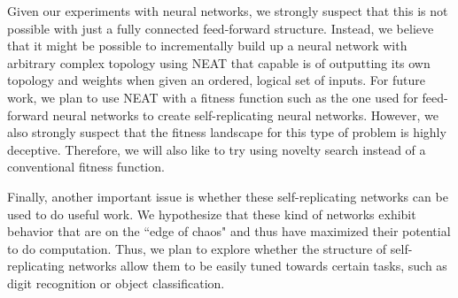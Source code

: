 \documentclass[12pt]{article}
\begin{document}
Given our experiments with neural networks, we strongly suspect that this is
not possible with just a fully connected feed-forward structure. Instead, we believe
that it might be possible to incrementally build up a neural network with arbitrary
complex topology using NEAT \cite{stanley2004efficient} that capable is of outputting
its own topology and weights when given an ordered, logical set of inputs. 
For future work, we plan to use NEAT with a fitness 
function such as the one used for feed-forward neural networks to create self-replicating
neural networks. However, we also strongly
suspect that the fitness landscape for this type of problem is highly deceptive.
Therefore, we will also like to try using novelty search \cite{lehman2008exploiting}
instead of a conventional fitness function.

Finally, another important issue is whether these self-replicating networks
can be used to do useful work. We hypothesize that these kind of networks exhibit
behavior that are on the ``edge of chaos" and thus have maximized their potential
to do computation. Thus, we plan to explore whether the structure of
self-replicating networks allow them to be easily tuned towards certain tasks, such as digit
recognition or object classification.

\renewcommand{\refname}{\section{References}}


\end{document}
